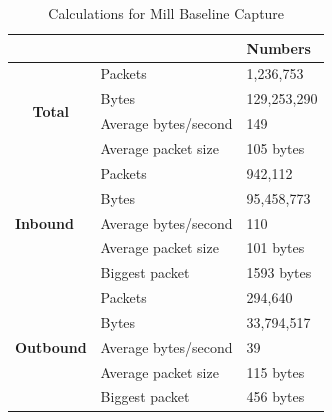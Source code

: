 \begin{table}[H]
    \caption{Calculations for Mill Baseline Capture}
    \centering
    \begin{tabular}{ll|l|}
        \cline{3-3}                                              &                      & \textbf{Numbers} \\ \hline
        \multicolumn{1}{|c|}{\multirow{4}{*}{\textbf{Total}}}    & Packets              & 1,236,753       \\ \cline{2-3} 
        \multicolumn{1}{|c|}{}                                   & Bytes                & 129,253,290     \\ \cline{2-3} 
        \multicolumn{1}{|c|}{}                                   & Average bytes/second & 149             \\ \cline{2-3} 
        \multicolumn{1}{|c|}{}                                   & Average packet size  & 105 bytes       \\ \hline
        \multicolumn{1}{|l|}{\multirow{5}{*}{\textbf{Inbound}}}  & Packets              & 942,112         \\ \cline{2-3} 
        \multicolumn{1}{|l|}{}                                   & Bytes                & 95,458,773      \\ \cline{2-3} 
        \multicolumn{1}{|l|}{}                                   & Average bytes/second & 110             \\ \cline{2-3} 
        \multicolumn{1}{|l|}{}                                   & Average packet size  & 101 bytes       \\ \cline{2-3} 
        \multicolumn{1}{|l|}{}                                   & Biggest packet       & 1593 bytes      \\ \hline
        \multicolumn{1}{|l|}{\multirow{5}{*}{\textbf{Outbound}}} & Packets              & 294,640         \\ \cline{2-3} 
        \multicolumn{1}{|l|}{}                                   & Bytes                & 33,794,517      \\ \cline{2-3} 
        \multicolumn{1}{|l|}{}                                   & Average bytes/second & 39              \\ \cline{2-3} 
        \multicolumn{1}{|l|}{}                                   & Average packet size  & 115 bytes       \\ \cline{2-3} 
        \multicolumn{1}{|l|}{}                                   & Biggest packet       & 456 bytes       \\ \hline
    \end{tabular}
    \label{tab:MillBaselineCalculations}
\end{table}

